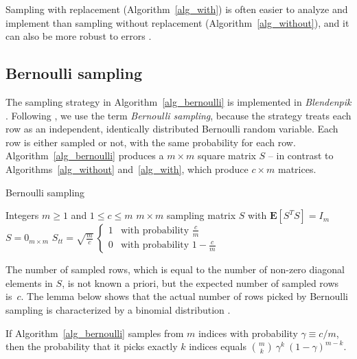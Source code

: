 \documentclass{siamltex}
\begin{document}
Sampling with replacement (Algorithm~\ref{alg_with}) is often easier
to analyze and implement than sampling without replacement
(Algorithm~\ref{alg_without}), and it can also
be more robust to errors \cite[\S 1.2]{MitzUpf}.

\subsection{Bernoulli sampling}\label{s_bernoulli}
The sampling strategy in Algorithm~\ref{alg_bernoulli}
is implemented in \textsl{Blendenpik}  \cite[Algorithm 1]{AMTol10}.  
Following \cite[Section A]{GrN10}, we use the term
\textsl{Bernoulli sampling}, because the strategy
treats each row as an independent, identically 
distributed Bernoulli random variable. Each row is either sampled or not, 
with the same probability for each row.
Algorithm~\ref{alg_bernoulli} produces a 
$m\times m$ square matrix $S$ --
in contrast to Algorithms~\ref{alg_without} and~\ref{alg_with},
which produce $c\times m$ matrices.

\begin{algorithm}
\caption{Bernoulli sampling
\cite{AMTol10,GT11,GrN10}}\label{alg_bernoulli}
\begin{algorithmic}
\REQUIRE Integers  $m\geq 1$ and $1\leq c\leq m$ 
\ENSURE $m\times m$ sampling matrix $S$ with ${\mathbf{E}}[S^TS]=  I_m$
\STATE
\STATE $S=0_{m\times m}$   
\STATE \medskip
$S_{tt} = \sqrt{\tfrac{m}{c}}\>\begin{cases}
1 & \text{with probability $\tfrac{c}{m}$} \\
0 & \text{with probability  $1-\tfrac{c}{m}$} 
\end{cases}$
\ENDFOR
\end{algorithmic}
\end{algorithm}

The number of sampled rows, which is equal to the number of non-zero
diagonal elements in $S$, is not known a priori, but the expected
number of sampled rows is~$c$. The lemma below shows that the actual number of
rows picked by Bernoulli sampling is characterized by a binomial
distribution \cite[Section 2.2.2]{Ross}.

\begin{lemma}\label{l_bernoulli}
If Algorithm~\ref{alg_bernoulli} samples from $m$ indices with probability
$\gamma\equiv c/m$, then
the probability that it picks exactly $k$ indices equals
$\binom{m}{k}\>\gamma^{k}\>(1-\gamma)^{m-k}$.
\end{lemma}
\end{document}
